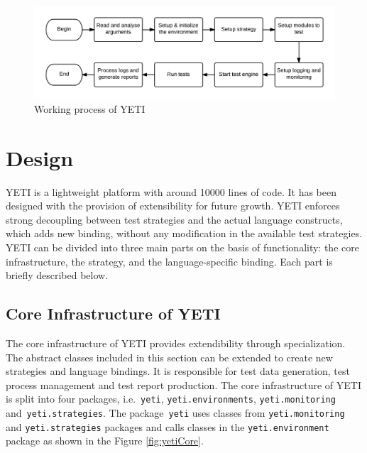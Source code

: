 \begin{figure}[h]
	\centering
	\includegraphics[width=14.5cm, height=3.5cm]{chapter3/workingProcess.png}
	\caption{Working process of YETI}
	\label{fig:yetiOverview}
\end{figure}


\section{Design}
YETI is a lightweight platform with around 10000 lines of code. It has been designed with the provision of extensibility for future growth. YETI enforces strong decoupling between test strategies and the actual language constructs, which adds new binding, without any modification in the available test strategies. YETI can be divided into three main parts on the basis of functionality: the core infrastructure, the strategy, and the language-specific binding. Each part is briefly described below. 

\subsection{Core Infrastructure of YETI}
The core infrastructure of YETI provides extendibility through specialization. The abstract classes included in this section can be extended to create new strategies and language bindings. It is responsible for test data generation, test process management and test report production. The core infrastructure of YETI is split into four packages, i.e.~\verb+yeti+, \verb+yeti.environments+, \verb+yeti.monitoring+ and~\verb+yeti.strategies+. The package~\verb+yeti+ uses
classes from \verb+yeti.monitoring+ and \verb+yeti.strategies+ packages and calls classes in the \verb+yeti.environment+ package as shown in the Figure \ref{fig:yetiCore}.

